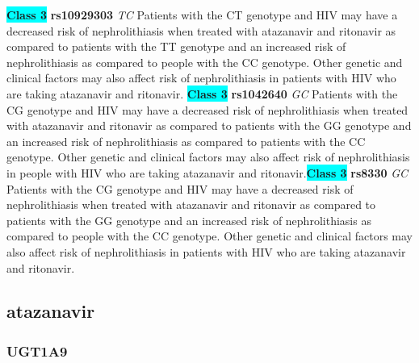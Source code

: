 \documentclass{book}
\begin{document}
\begin{center}
\textbf{\colorbox{cyan} {Class 3}} \textbf{ rs10929303 } \textit{ TC }
Patients with the CT genotype and HIV may have a decreased risk of nephrolithiasis when treated with atazanavir and ritonavir as compared to patients with the TT genotype and an increased risk of nephrolithiasis as compared to people with the CC genotype. Other genetic and clinical factors may also affect risk of nephrolithiasis in patients with HIV who are taking atazanavir and ritonavir. \textbf{\colorbox{cyan} {Class 3}} \textbf{ rs1042640 } \textit{ GC }
Patients with the CG genotype and HIV may have a decreased risk of nephrolithiasis when treated with atazanavir and ritonavir as compared to patients with the GG genotype and an increased risk of nephrolithiasis as compared to patients with the CC genotype. Other genetic and clinical factors may also affect risk of nephrolithiasis in people with HIV who are taking atazanavir and ritonavir.\textbf{\colorbox{cyan} {Class 3}} \textbf{ rs8330 } \textit{ GC }
Patients with the CG genotype and HIV may have a decreased risk of nephrolithiasis when treated with atazanavir and ritonavir as compared to patients with the GG genotype and an increased risk of nephrolithiasis as compared to people with the CC genotype. Other genetic and clinical factors may also affect risk of nephrolithiasis in patients with HIV who are taking atazanavir and ritonavir.


\end{center}\subsection{ atazanavir }


\subsubsection{ UGT1A9 }
\end{document}
